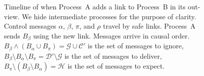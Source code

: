 \begin{figure}
  \begin{center}
    
    \caption{\label{fig:timelineproof}\label{fig:timeline}Timeline of
      \RPCBROADCAST when Process~A adds a link to Process~B in its out-view. We
      hide intermediate processes for the purpose of clarity. Control messages
      $\alpha$, $\beta$, $\pi$, and $\rho$ travel by safe links. Process~A sends
      $B_\beta$ using the new link. Messages arrive in causal order.
      $B_\beta \wedge (B_\alpha \cup B_\pi) = \mathcal{G} \cup \mathcal{C}'$ is
      the set of messages to ignore,
      $B_\beta \setminus B_\alpha \setminus B_\pi = \mathcal{D}'\setminus
      \mathcal{G}$
      is the set of messages to deliver,
      $B_\pi \setminus (B_\beta \setminus B_\alpha) = \mathcal{H}$ is the set of
      messages to expect.}
  \end{center}
\end{figure}

